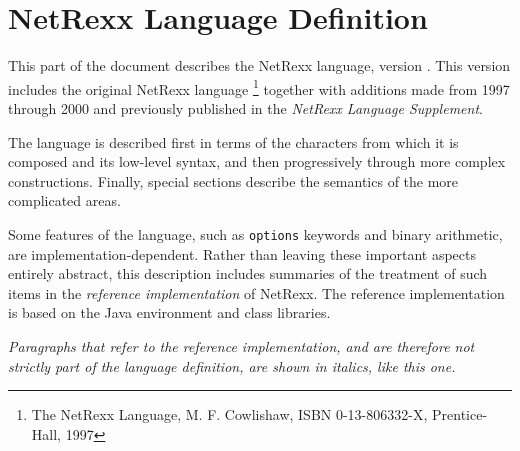 \chapter{NetRexx Language Definition}\label{refpart3}
 
This part of the document describes the NetRexx language, version \nrversion{}.
This version includes the original NetRexx language
\footnote{
The NetRexx Language, M. F. Cowlishaw,
ISBN 0-13-806332-X, Prentice-Hall, 1997
}
together with additions made from 1997 through 2000 and previously
published in the \emph{NetRexx Language Supplement}.
 
The language is described first in terms of the characters from which it
is composed and its low-level syntax, and then progressively through
more complex constructions.
Finally, special sections describe the semantics of the more
complicated areas.
 
Some features of the language, such as \texttt{options} keywords and
binary arithmetic, are implementation-dependent.  Rather than leaving
these important aspects entirely abstract, this description includes
summaries of the treatment of such items in the \emph{reference
implementation} of NetRexx.  The reference implementation is based
on the Java environment and class libraries.
 
\emph{Paragraphs that refer to the reference implementation,
and are therefore not strictly part of the language definition, are
shown in italics, like this one.}
